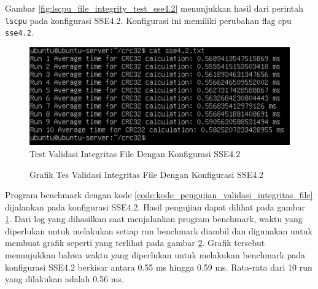 Gambar \ref{fig:lscpu_file_integrity_test_sse4.2} menunjukkan hasil dari perintah \texttt{lscpu} pada konfigurasi SSE4.2. Konfigurasi ini memiliki perubahan flag cpu \texttt{sse4.2}.

\begin{figure}
    \centering
    \includegraphics[width=1\textwidth]
    {assets/pics/crc-test/sse4.2.jpeg}
    \caption{Test Validasi Integritas File Dengan Konfigurasi SSE4.2}
    \label{fig:file_integrity_test_sse4.2}
\end{figure}

\begin{figure}
    \centering
    \caption{Grafik Tes Validasi Integritas File Dengan Konfigurasi SSE4.2}
    \label{fig:file_integrity_test_sse4.2_graph}
\end{figure}

Program benchmark dengan kode \ref{code:kode_pengujian_validasi_integritas_file} dijalankan pada konfigurasi SSE4.2. Hasil pengujian dapat dilihat pada gambar \ref{fig:file_integrity_test_sse4.2}. Dari log yang dihasilkan saat menjalankan program benchmark, waktu yang diperlukan untuk melakukan setiap run benchmark diambil dan digunakan untuk membuat grafik seperti yang terlihat pada gambar \ref{fig:file_integrity_test_sse4.2_graph}. Grafik tersebut menunjukkan bahwa waktu yang diperlukan untuk melakukan benchmark pada konfigurasi SSE4.2 berkisar antara 0.55 ms hingga 0.59 ms. Rata-rata dari 10 run yang dilakukan adalah 0.56 ms.

